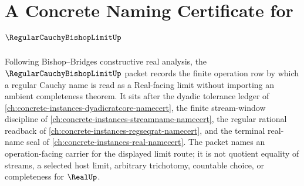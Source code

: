 \chapter{A Concrete Naming Certificate for $\RegularCauchyBishopLimitUp$}
\label{ch:concrete-instances-regular-cauchy-bishop-limit-namecert}

Following Bishop--Bridges constructive real analysis, the $\RegularCauchyBishopLimitUp$ packet records the finite operation row by which a regular Cauchy name is read as a Real-facing limit without importing an ambient completeness theorem. It sits after the dyadic tolerance ledger of \autoref{ch:concrete-instances-dyadicratcore-namecert}, the finite stream-window discipline of \autoref{ch:concrete-instances-streamname-namecert}, the regular rational readback of \autoref{ch:concrete-instances-regseqrat-namecert}, and the terminal real-name seal of \autoref{ch:concrete-instances-real-namecert}. The packet names an operation-facing carrier for the displayed limit route; it is not quotient equality of streams, a selected host limit, arbitrary trichotomy, countable choice, or completeness for $\RealUp$.

